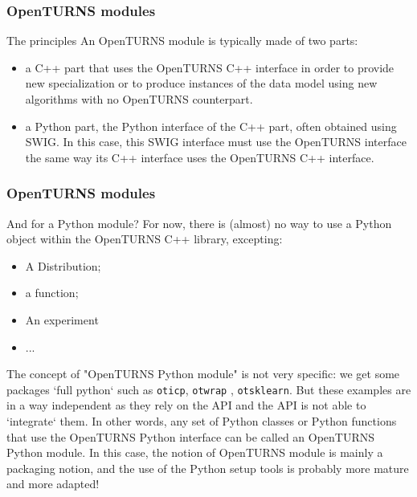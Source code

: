 \documentclass[8pt]{beamer}
\begin{document}
\begin{frame}
  \frametitle{OpenTURNS modules}
  \centering {}
  \begin{block}{The principles}
    An OpenTURNS module is typically made of two parts:
    \begin{itemize}
    \item a C++ part that uses the OpenTURNS C++ interface in order to provide new specialization or to produce instances of the data model using new algorithms with no OpenTURNS counterpart.
    \item a Python part, the Python interface of the C++ part, often obtained using SWIG. In this case, this SWIG interface must use the OpenTURNS interface the same way its C++ interface uses the OpenTURNS C++ interface.
    \end{itemize}
  \end{block}
\end{frame}
\begin{frame}
  \frametitle{OpenTURNS modules}
  \begin{block}{And for a Python module?}
    For now, there is (almost) no way to use a Python object within the OpenTURNS C++ library, excepting:
    \begin{itemize}
    \item A Distribution;
    \item a function;
    \item An experiment
    \item ...
    \end{itemize}
    The concept of "OpenTURNS Python module" is not very specific: we get some packages `full python` such as \texttt{oticp},  \texttt{otwrap} , \texttt{otsklearn}. But these examples are in a way independent as they rely on the API and the API is not able to `integrate` them.
    In other words, any set of Python classes or Python functions that use the OpenTURNS Python interface can be called an OpenTURNS Python module. In this case, the notion of OpenTURNS module is mainly a packaging notion, and the use of the Python setup tools is probably more mature and more adapted!
  \end{block}
\end{frame}
\end{document}

